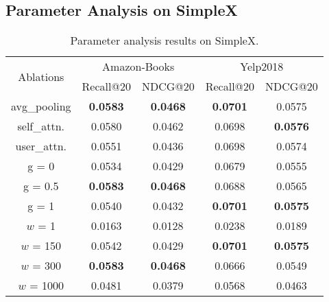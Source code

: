 \documentclass[sigconf,authorversion]{acmart}
\begin{document}
\subsection{Parameter Analysis on SimpleX}
\label{sec:ablation}
\begin{table}[!t]
\centering
\setlength{\tabcolsep}{1.1ex}
\caption{Parameter analysis results on SimpleX.}
\begin{tabular}{c|cc|cc}
\hline
\multirow{2}{*}{Ablations} & \multicolumn{2}{c|}{Amazon-Books}  & \multicolumn{2}{c}{Yelp2018}        \\ \cline{2-5} 
                 & Recall@20 & \hspace{-1ex}NDCG@20 & Recall@20 & \hspace{-1ex}NDCG@20 \\ \hline
avg\_pooling & \textbf{0.0583}
    & \textbf{0.0468}
  & \textbf{0.0701}
    & 0.0575
  \\
self\_attn. & 0.0580 
    & 0.0462 
  & 0.0698
   & \textbf{0.0576}
  \\
user\_attn. & 0.0551 
    & 0.0436 
  & 0.0698 
   & 0.0574   \\
 \hline
\hspace{-1.5ex}g = 0 & 0.0534    & 0.0429 &  0.0679   &  0.0555\\
g = 0.5 & \textbf{0.0583}
    & \textbf{0.0468}  & 0.0688  &  0.0565\\
\hspace{-1.5ex}g = 1 & 0.0540   & 0.0432 & \textbf{0.0701}
   & \textbf{0.0575}   \\
 \hline
$w$ = 1\quad\quad &  0.0163   &  0.0128 & 0.0238 
   &  0.0189 
\\
$w$ = 150\quad & 0.0542 

    & 0.0429 
 & \textbf{0.0701} 
  &  \textbf{0.0575}
\\
$w$ = 300\quad & \textbf{0.0583}
  & \textbf{0.0468} 
 & 0.0666 

   & 0.0549 
   \\
\hspace{1ex}$w$ = 1000 & 0.0481 
  & 0.0379 
 & 0.0568 

   & 0.0463 
  \\
 \hline
\end{tabular}
\label{ablationres}
\end{table}
\end{document}
